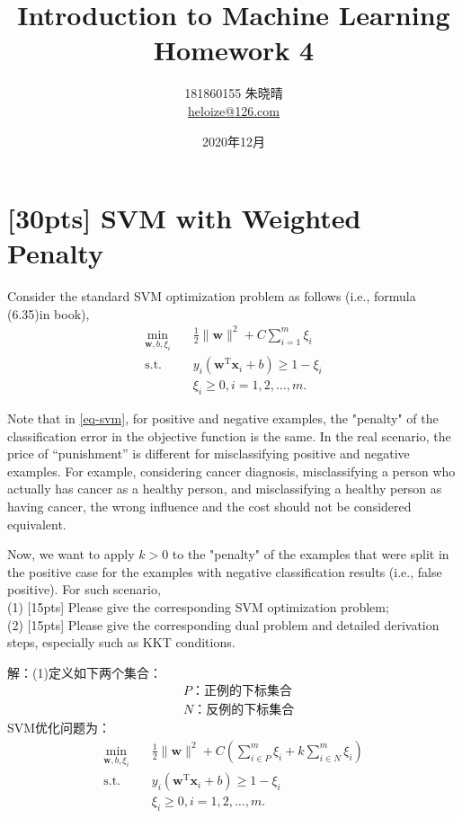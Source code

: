 \documentclass[a4paper,utf8]{article}
\title{Introduction to Machine Learning\\Homework 4}
\author{181860155 朱晓晴\\\href{mailto:heloize@126.com}{heloize@126.com}}
\date{2020年12月}
\begin{document}
	\maketitle
	
    \section{[30pts] SVM with Weighted Penalty}
    Consider the standard SVM optimization problem as follows (i.e., formula (6.35)in book),
    \begin{equation}
    	\label{eq-svm}
    	\begin{split}
    		\min_{\mathbf{w},b,\xi_i}& \quad \frac{1}{2} \lVert \mathbf{w} \rVert^2 + C\sum_{i=1}^m\xi_i\\
    		\text{s.t.}&  \quad y_i(\mathbf{w}^\mathrm{T}\mathbf{x}_i + b)\geq 1-\xi_i\\
    		& \quad \xi_i \geq 0, i = 1,2,\dots,m.
    	\end{split}
    \end{equation}

    Note that in \eqref{eq-svm}, for positive and negative examples, the "penalty" of the classification error in the objective function is the same. In the real scenario, the price of “punishment” is different for misclassifying positive and negative examples. For example, considering cancer diagnosis, misclassifying a person who actually has cancer as a healthy person, and misclassifying a healthy person as having cancer, the wrong influence and the cost should not be considered equivalent.

    Now, we want to apply $k>0$ to the "penalty" of the examples that were split in the positive case for the examples with negative classification results (i.e., false positive). For such scenario,\\
   (1) [15pts] Please give the corresponding SVM optimization problem;\\
   (2) [15pts] Please give the corresponding dual problem and detailed derivation steps, especially such as KKT conditions.

   \noindent
   解：(1)定义如下两个集合：
   \begin{align*}
		& P\text{：正例的下标集合} \\
		& N\text{：反例的下标集合}
   \end{align*}                                                                      
   SVM优化问题为：
   \begin{equation}
	\begin{split}
		\min_{\bm{w},b,\xi_i}& \quad \frac{1}{2} \lVert \bm{w} \rVert^2 + C(\sum_{i\in P}^m\xi_i+k\sum_{i\in N}^m\xi_i)\\
		\text{s.t.}&  \quad y_i(\bm{w}^\mathrm{T}\bm{x}_i + b)\geq 1-\xi_i\\
		& \quad \xi_i \geq 0, i = 1,2,\dots,m.
	\end{split}
	\end{equation}
\end{document}

